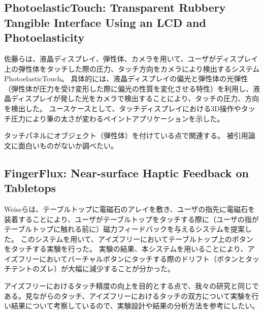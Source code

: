 \documentclass[11pt,a4paper]{jarticle}
\begin{document}
\subsection{PhotoelasticTouch: Transparent Rubbery Tangible Interface Using an LCD and Photoelasticity\cite{Sato:2009}}
佐藤らは、液晶ディスプレイ、弾性体、カメラを用いて、ユーザがディスプレイ上の弾性体をタッチした際の圧力、タッチ方向をカメラにより検出するシステムPhotoelasticTouch。
具体的には、液晶ディスプレイの偏光と弾性体の光弾性（弾性体が圧力を受け変形した際に偏光の性質を変化させる特性）を利用し、液晶ディスプレイが発した光をカメラで検出することにより、タッチの圧力、方向を検出した。
ユースケースとして、タッチディスプレイにおける3D操作やタッチ圧力により筆の太さが変わるペイントアプリケーションを示した。

タッチパネルにオブジェクト（弾性体）を付けている点で関連する。
被引用論文に面白いものがないか調べたい。

\subsection{FingerFlux: Near-surface Haptic Feedback on Tabletops\cite{Weiss:2011}}
Weissらは、テーブルトップに電磁石のアレイを敷き、ユーザの指先に電磁石を装着することにより、ユーザがテーブルトップをタッチする際に（ユーザの指がテーブルトップに触れる前に）磁力フィードバックを与えるシステムを提案した。
このシステムを用いて、アイズフリーにおいてテーブルトップ上のボタンをタッチする実験を行った。
実験の結果、本システムを用いることにより、アイズフリーにおいてバーチャルボタンにタッチする際のドリフト（ボタンとタッチテントのズレ）が大幅に減少することが分かった。

アイズフリーにおけるタッチ精度の向上を目的とする点で、我々の研究と同じである。見ながらのタッチ、アイズフリーにおけるタッチの双方について実験を行い結果について考察しているので、実験設計や結果の分析方法を参考にしたい。

\end{document}
